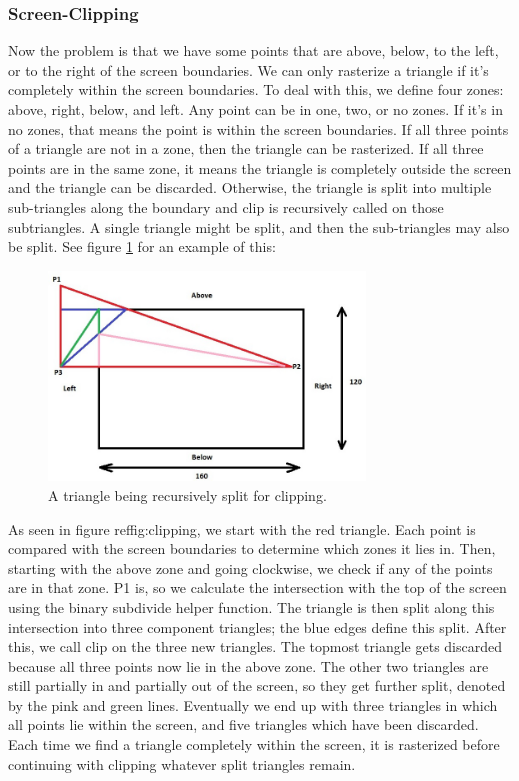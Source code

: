 \documentclass[onecolumn]{IEEEtran}
\begin{document}
\subsubsection{Screen-Clipping}
Now the problem is that we have some points that are above, below, to the left, or to the right of the screen boundaries.  We can only rasterize a triangle if it's completely within the screen boundaries.  To deal with this, we define four zones: above, right, below, and left.  Any point can be in one, two, or no zones.  If it's in no zones, that means the point is within the screen boundaries.  If all three points of a triangle are not in a zone, then the triangle can be rasterized.  If all three points are in the same zone, it means the triangle is completely outside the screen and the triangle can be discarded.  Otherwise, the triangle is split into multiple sub-triangles along the boundary and clip is recursively called on those subtriangles.  A single triangle might be split, and then the sub-triangles may also be split.  See figure \ref{fig:clipping} for an example of this:

\begin{figure}[H]
	\centering
	\includegraphics[width=0.75\textwidth]{clipping.png}
	\caption{A triangle being recursively split for clipping.}
	\label{fig:clipping}
\end{figure}

As seen in figure ref{fig:clipping}, we start with the red triangle.  Each point is compared with the screen boundaries to determine which zones it lies in.  Then, starting with the above zone and going clockwise, we check if any of the points are in that zone.  P1 is, so we calculate the intersection with the top of the screen using the binary subdivide helper function.  The triangle is then split along this intersection into three component triangles; the blue edges define this split.  After this, we call clip on the three new triangles.  The topmost triangle gets discarded because all three points now lie in the above zone.  The other two triangles are still partially in and partially out of the screen, so they get further split, denoted by the pink and green lines.  Eventually we end up with three triangles in which all points lie within the screen, and five triangles which have been discarded.  Each time we find a triangle completely within the screen, it is rasterized before continuing with clipping whatever split triangles remain.
\end{document}
